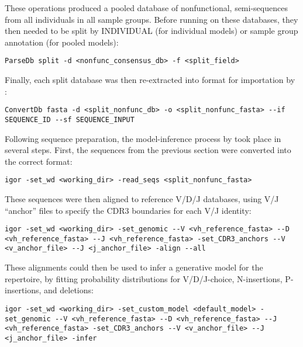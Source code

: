 \noindent These operations produced a pooled database of nonfunctional, semi-\naive sequences from all individuals in all sample groups. Before running  on these databases, they then needed to be split by INDIVIDUAL (for individual models) or sample group annotation (for pooled models):

\begin{lstlisting}
ParseDb split -d <nonfunc_consensus_db> -f <split_field> 
\end{lstlisting}

\noindent Finally, each split database was then re-extracted into  format for importation by :

\begin{lstlisting}
ConvertDb fasta -d <split_nonfunc_db> -o <split_nonfunc_fasta> --if SEQUENCE_ID --sf SEQUENCE_INPUT
\end{lstlisting}


Following sequence preparation, the model-inference process by  took place in several steps. First, the sequences from the previous section were converted into the correct format:

\begin{lstlisting}
igor -set_wd <working_dir> -read_seqs <split_nonfunc_fasta>
\end{lstlisting}

\noindent These sequences were then aligned to reference V/D/J databases, using V/J ``anchor'' files to specify the CDR3 boundaries for each V/J identity:

\begin{lstlisting}
igor -set_wd <working_dir> -set_genomic --V <vh_reference_fasta> --D <vh_reference_fasta> --J <vh_reference_fasta> -set_CDR3_anchors --V <v_anchor_file> --J <j_anchor_file> -align --all
\end{lstlisting}

\noindent These alignments could then be used to infer a generative model for the repertoire, by fitting probability distributions for V/D/J-choice, N-insertions, P-insertions, and deletions:

\begin{lstlisting}
igor -set_wd <working_dir> -set_custom_model <default_model> -set_genomic --V <vh_reference_fasta> --D <vh_reference_fasta> --J <vh_reference_fasta> -set_CDR3_anchors --V <v_anchor_file> --J <j_anchor_file> -infer
\end{lstlisting}

